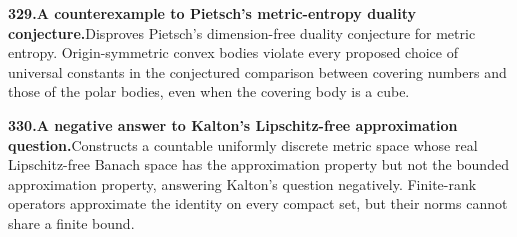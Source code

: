 \documentclass[11pt,a4paper]{article}
\begin{document}
  \par \begin{minipage}{\linewidth}
  \fontsize{10.5}{12.6}\selectfont\RaggedRight
  \hypertarget{result 329}{}
  {\bfseries\textcolor{muted}{329.}\enspace A counterexample to Pietsch's metric-entropy duality conjecture.}\enspace Disproves Pietsch's dimension-free duality conjecture for metric entropy. Origin-symmetric convex bodies violate every proposed choice of universal constants in the conjectured comparison between covering numbers and those of the polar bodies, even when the covering body is a cube.\par
  \end{minipage}\par\vspace{5pt}



  \par \begin{minipage}{\linewidth}
  \fontsize{10.5}{12.6}\selectfont\RaggedRight
  \hypertarget{result 330}{}
  {\bfseries\textcolor{muted}{330.}\enspace A negative answer to Kalton's Lipschitz-free approximation question.}\enspace Constructs a countable uniformly discrete metric space whose real Lipschitz-free Banach space has the approximation property but not the bounded approximation property, answering Kalton's question negatively. Finite-rank operators approximate the identity on every compact set, but their norms cannot share a finite bound.\par
  \end{minipage}\par\vspace{5pt}
\end{document}
